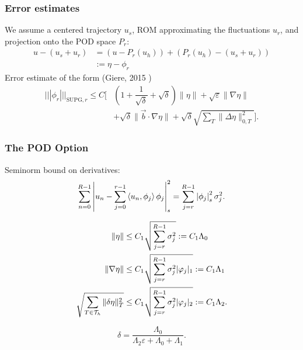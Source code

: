 \documentclass[8pt]{beamer}
\begin{document}
    \begin{frame}
    \frametitle{Error estimates}
    We assume a centered trajectory \(u_s\), ROM approximating the
    fluctuations \(u_r\), and projection onto the POD space \(P_r\):
    \begin{equation}
        \begin{aligned}
            u - (u_s + u_r) &= (u - P_r(u_h)) + (P_r(u_h) - (u_s + u_r))      \\
            &:= \eta - \phi_r
        \end{aligned}
    \end{equation}
    \pause
    Error estimate of the form (Giere, 2015 \cite{giere2015supg})
    \begin{equation}
        \begin{aligned}
            |||\phi_r|||_{\mathrm{SUPG}, r}
            \leq C
            \bigg[
            &\left(1 + \dfrac{1}{\sqrt{\delta}} + \sqrt{\delta}\right)
            \|\eta\|
            + \sqrt{\varepsilon} \|\nabla \eta\|                              \\
            &+ \sqrt{\delta} \|\vec{b} \cdot \nabla \eta\|
            + \sqrt{\delta} \sqrt{\sum_T \|\Delta \eta\|_{0,T}^2}
            \bigg].
        \end{aligned}
    \end{equation}
\end{frame}

\begin{frame}
    \frametitle{The POD Option}
    Seminorm bound on derivatives: \cite{iliescu2013variational, singler2014new}
    \begin{equation}
        \sum_{n = 0}^{R - 1} \left| u_n - \sum_{j = 0}^{r - 1} \left\langle u_n, \phi_{j}\right\rangle \phi_j \right|_s^2
        = \sum_{j = r}^{R - 1} \left| \phi_j \right|_s^2 \sigma_j^2.
    \end{equation}

    \begin{align}
        \| \eta \| &\leq C_1 \sqrt{\sum_{j = r}^{R - 1} \sigma_j^2}
        := C_1 \Lambda_0                                                      \\
        \| \nabla \eta \|
        &\leq C_1 \sqrt{\sum_{j = r}^{R - 1} \sigma_j^2 | \varphi_j |_1}
        := C_1 \Lambda_1                                                      \\
        \sqrt{\sum_{T\in \mathcal{T}_h} \| \delta \eta \|_T^2}
        &\leq C_1 \sqrt{\sum_{j = r}^{R - 1} \sigma_j^2 | \varphi_j |_2}
        := C_1 \Lambda_2.
    \end{align}

    \pause
    \begin{equation}
        \delta = \dfrac{\Lambda_{0}}{\Lambda_{2} \varepsilon + \Lambda_{0} +
        \Lambda_{1}}.
    \end{equation}
\end{frame}
\end{document}

